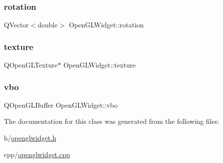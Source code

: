 \subsubsection{\texorpdfstring{rotation}{rotation}}
{\footnotesize\ttfamily Q\+Vector$<$double$>$ Open\+G\+L\+Widget\+::rotation\hspace{0.3cm}{\ttfamily [private]}}

\mbox{\label{class_open_g_l_widget_afb76f6d9354bb49993c10e6fb6da7349}} 
\subsubsection{\texorpdfstring{texture}{texture}}
{\footnotesize\ttfamily Q\+Open\+G\+L\+Texture$\ast$ Open\+G\+L\+Widget\+::texture\hspace{0.3cm}{\ttfamily [private]}}

\mbox{\label{class_open_g_l_widget_a4b64b78f67c6da7e90cae7a4b34b5dce}} 
\subsubsection{\texorpdfstring{vbo}{vbo}}
{\footnotesize\ttfamily Q\+Open\+G\+L\+Buffer Open\+G\+L\+Widget\+::vbo\hspace{0.3cm}{\ttfamily [private]}}



The documentation for this class was generated from the following files\+:\begin{DoxyCompactItemize}
\item 
h/\mbox{\hyperlink{openglwidget_8h}{openglwidget.\+h}}\item 
cpp/\mbox{\hyperlink{openglwidget_8cpp}{openglwidget.\+cpp}}\end{DoxyCompactItemize}
